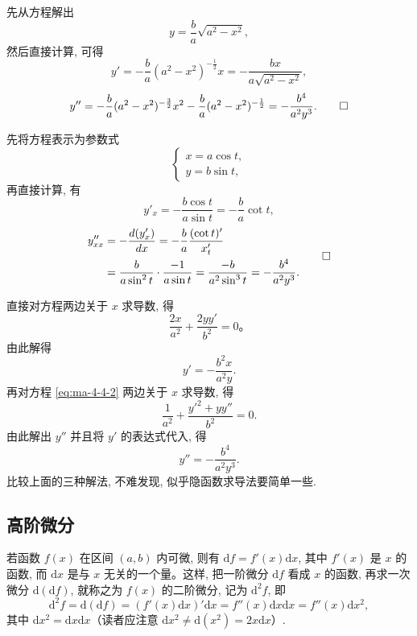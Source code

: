 \begin{solve}[{解法 1}]
先从方程解出
\[
  y=\frac{b}{a}\sqrt{a^2-x^2},
\]
然后直接计算, 可得
\[
  y'
  =
  -\frac{b}{a}(a^2-x^2)^{-\frac12}x
  =
  -\frac{bx}{a\sqrt{a^2-x^2}},
\]
\[
  y''
  =
  -\frac{b}{a}(a^2-x^2)^{-\frac32}x^2
  -
  \frac{b}{a}(a^2-x^2)^{-\frac12}
  =
  -\frac{b^4}{a^2y^3}.
\qedhere
\]
\end{solve}


\begin{solve}[{解法 2}]
先将方程表示为参数式
\[
  \begin{cases}
    x=a\cos t,\\
    y=b\sin t,
  \end{cases}
\]
再直接计算, 有
\[
  y'_x=-\frac{b\cos t}{a\sin t}=-\frac{b}{a}\cot t,
\]
\[
\begin{aligned}
  y''_{xx}
  &=
  -\frac{d(y'_x)}{dx}
  =
  -\frac{b}{a}\frac{(\cot t)'}{x'_t}  \\
  &=
  \frac{b}{a\sin^2t}\cdot\frac{-1}{a\sin t}
  =
  \frac{-b}{a^2\sin^3t}
  =
  -\frac{b^4}{a^2y^3}.
\end{aligned}
\qedhere
\]
\end{solve}


\begin{solve}[{解法 3}]
直接对方程两边关于 $x$ 求导数, 得
\begin{equation}
  \frac{2x}{a^2}+\frac{2yy'}{b^2}=0。\label{eq:ma-4-4-2}
\end{equation}
由此解得
\[
  y'=-\frac{b^2x}{a^2y}.
\]
再对方程 \eqref{eq:ma-4-4-2} 两边关于 $x$ 求导数, 得
\[
  \frac1{a^2}+\frac{y'^2+yy''}{b^2}=0.
\]
由此解出 $y''$ 并且将 $y'$ 的表达式代入, 得
\[
  y''=-\frac{b^4}{a^2y^3}.
\]
比较上面的三种解法, 不难发现, 似乎隐函数求导法要简单一些.
\end{solve}


\subsection{高阶微分}
\label{subsec:ma-4-4-4}

若函数 $f(x)$ 在区间 $(a,b)$ 内可微, 则有 $\mathrm df=f'(x)\mathrm dx$, 其中 $f'(x)$ 是 $x$ 的函数, 而 $\mathrm dx$ 是与 $x$ 无关的一个量。这样, 把一阶微分 $\mathrm df$ 看成 $x$ 的函数, 再求一次微分 $\mathrm d(\mathrm df)$, 就称之为 $f(x)$ 的二阶微分, 记为 $\mathrm d^2f$, 即
\[
  \mathrm d^2f
  =
  \mathrm d(\mathrm df)
  =
  (f'(x)\mathrm dx)'\mathrm dx
  =
  f''(x)\mathrm dx\mathrm dx
  =
  f''(x)\mathrm dx^2,
\]
其中 $\mathrm dx^2=\mathrm dx\mathrm dx$（读者应注意 $\mathrm dx^2\ne \mathrm d(x^2)=2x\mathrm dx$）.

